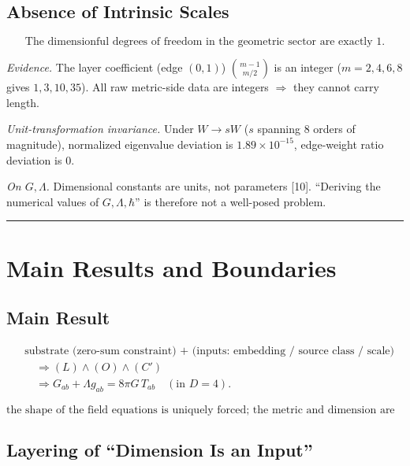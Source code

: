 \documentclass[
  11pt,
]{article}
\begin{document}
\subsection{Absence of Intrinsic
Scales}\label{absence-of-intrinsic-scales}

\[
\text{The dimensionful degrees of freedom in the geometric sector are exactly }1.
\tag{7.1}
\]

\emph{Evidence.} The layer coefficient (edge \((0,1)\))
\(\binom{m-1}{m/2}\) is an integer (\(m=2,4,6,8\) gives \(1,3,10,35\)).
All raw metric-side data are integers \(\Rightarrow\) they cannot carry
length.

\emph{Unit-transformation invariance.} Under \(W\to sW\) (\(s\) spanning
8 orders of magnitude), normalized eigenvalue deviation is
\(1.89\times10^{-15}\), edge-weight ratio deviation is \(0\).

\emph{On \(G,\Lambda\).} Dimensional constants are units, not parameters
{[}10{]}. ``Deriving the numerical values of \(G,\Lambda,\hbar\)'' is
therefore not a well-posed problem.

\begin{center}\rule{0.5\linewidth}{0.5pt}\end{center}

\section{Main Results and
Boundaries}\label{main-results-and-boundaries}

\subsection{Main Result}\label{main-result}

\[
\begin{aligned}
&\text{substrate (zero-sum constraint) + (inputs: embedding / source class / scale)}\\
&\quad\Longrightarrow (L)\wedge(O)\wedge(C')\\
&\quad\Longrightarrow G_{ab}+\Lambda g_{ab}=8\pi G\,T_{ab}\quad(\text{in }D=4).
\end{aligned}
\tag{8.1}
\]

\[
\text{the shape of the field equations is uniquely forced; the metric and dimension are inputs; the source is a no-go.}
\tag{8.2}
\]

\subsection{Layering of ``Dimension Is an
Input''}\label{layering-of-dimension-is-an-input}
\end{document}
